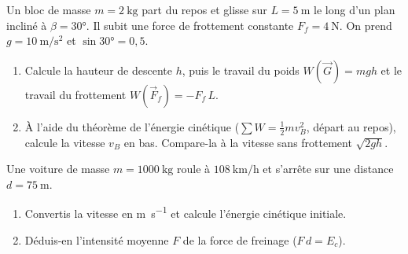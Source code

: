 \documentclass[11pt,a4paper]{article}
\newcommand{\vv}[1]{\vec{#1}}\newcommand{\ds}{\displaystyle}
\begin{document}
\begin{exo}
Un bloc de masse $m=\qty{2}{\kilogram}$ part du repos et glisse sur $L=\qty{5}{\metre}$ le long d'un
plan incliné à $\beta=\ang{30}$. Il subit une force de frottement constante $F_f=\qty{4}{\newton}$.
On prend $g=\qty{10}{\metre\per\second\squared}$ et $\sin\ang{30}=0,5$.
\begin{center}
\end{center}
\begin{enumerate}[label=\alph*)]
  \item Calcule la hauteur de descente $h$, puis le travail du poids $W(\vv G)=mgh$ et le travail du
        frottement $W(\vv F_f)=-F_f\,L$.
  \item À l'aide du théorème de l'énergie cinétique ($\sum W=\tfrac12 m v_B^2$, départ au repos),
        calcule la vitesse $v_B$ en bas. Compare-la à la vitesse sans frottement $\sqrt{2gh}$.
\end{enumerate}
\end{exo}

\begin{exo}
Une voiture de masse $m=\qty{1000}{\kilogram}$ roule à $\qty{108}{\kilo\metre\per\hour}$ et s'arrête sur
une distance $d=\qty{75}{\metre}$.
\begin{enumerate}[label=\alph*)]
  \item Convertis la vitesse en \si{\metre\per\second} et calcule l'énergie cinétique initiale.
  \item Déduis-en l'intensité moyenne $F$ de la force de freinage ($F\,d=E_c$).
\end{enumerate}
\end{exo}
\end{document}

